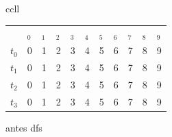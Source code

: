 \documentclass[12pt]{article}
\begin{document}
\begin{figure}[h!]
\begin{minipage}[b]{0.5\textwidth}
{\begin{tabular}{ccll}
\begin{tabular}{lllllllllll}
                           & $ _0$                  & $ _1$                  & $ _2$                  & $ _3$                  & $ _4$                  & $ _5$                  & $ _6$                  & $ _7$                  & $ _8$                  & $ _9$                  \\ \cline{2-11} 
\multicolumn{1}{l|}{$t_0$} & \multicolumn{1}{l|}{0} & \multicolumn{1}{l|}{1} & \multicolumn{1}{l|}{2} & \multicolumn{1}{l|}{3} & \multicolumn{1}{l|}{4} & \multicolumn{1}{l|}{5} & \multicolumn{1}{l|}{6} & \multicolumn{1}{l|}{7} & \multicolumn{1}{l|}{8} & \multicolumn{1}{l|}{9} \\ \cline{2-11} 
\multicolumn{1}{l|}{$t_1$} & \multicolumn{1}{l|}{0} & \multicolumn{1}{l|}{1} & \multicolumn{1}{l|}{2} & \multicolumn{1}{l|}{3} & \multicolumn{1}{l|}{4} & \multicolumn{1}{l|}{5} & \multicolumn{1}{l|}{6} & \multicolumn{1}{l|}{7} & \multicolumn{1}{l|}{8} & \multicolumn{1}{l|}{9} \\ \cline{2-11} 
\multicolumn{1}{l|}{$t_2$} & \multicolumn{1}{l|}{0} & \multicolumn{1}{l|}{1} & \multicolumn{1}{l|}{2} & \multicolumn{1}{l|}{3} & \multicolumn{1}{l|}{4} & \multicolumn{1}{l|}{5} & \multicolumn{1}{l|}{6} & \multicolumn{1}{l|}{7} & \multicolumn{1}{l|}{8} & \multicolumn{1}{l|}{9} \\ \cline{2-11} 
\multicolumn{1}{l|}{$t_3$} & \multicolumn{1}{l|}{0} & \multicolumn{1}{l|}{1} & \multicolumn{1}{l|}{2} & \multicolumn{1}{l|}{3} & \multicolumn{1}{l|}{4} & \multicolumn{1}{l|}{5} & \multicolumn{1}{l|}{6} & \multicolumn{1}{l|}{7} & \multicolumn{1}{l|}{8} & \multicolumn{1}{l|}{9} \\ \cline{2-11} 
\end{tabular}
\end{tabular}
		}
	    \caption{antes dfs}
  	\end{minipage}
\end{figure}
\end{document}
